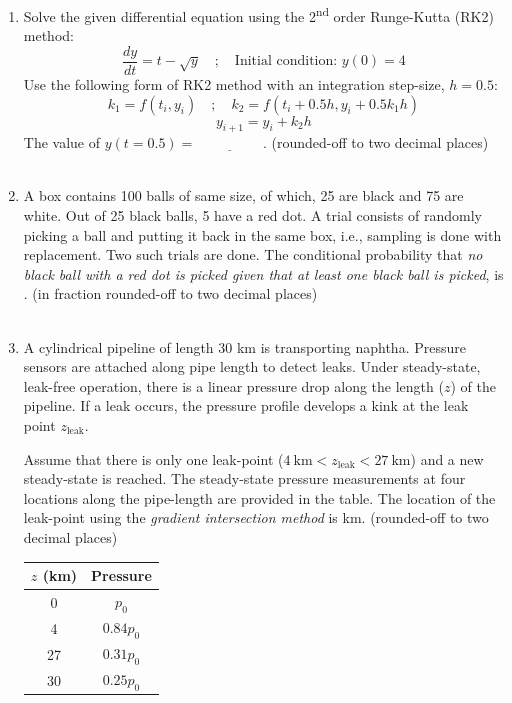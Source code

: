 \documentclass[12pt,a4paper]{article}
\begin{document}
\begin{enumerate}
\pagebreak

\item Solve the given differential equation using the 2\textsuperscript{nd} order Runge-Kutta (RK2) method: \hfill{}\[ \frac{dy}{dt} = t - \sqrt{y} \quad ; \quad \text{Initial condition: } y(0) = 4 \]
Use the following form of RK2 method with an integration step-size, $h = 0.5$:
\[ k_1 = f(t_i, y_i) \quad ; \quad k_2 = f(t_i + 0.5h, y_i + 0.5k_1 h) \]
\[ y_{i+1} = y_i + k_2 h \]
The value of $y(t = 0.5) = \underline{\hspace{2cm}}$. (rounded-off to two decimal places)\\\\

\item A box contains 100 balls of same size, of which, 25 are black and 75 are white. Out of 25 black balls, 5 have a red dot. A trial consists of randomly picking a ball and putting it back in the same box, i.e., sampling is done with replacement. Two such trials are done. The conditional probability that \textit{no black ball with a red dot is picked given that at least one black ball is picked}, is \underline{\hspace{2cm}}. (in fraction rounded-off to two decimal places) \hfill{}\\\\



\item A cylindrical pipeline of length 30 km is transporting naphtha. Pressure sensors are attached along pipe length to detect leaks. Under steady-state, leak-free operation, there is a linear pressure drop along the length ($z$) of the pipeline. If a leak occurs, the pressure profile develops a kink at the leak point $z_{\text{leak}}$.

\vspace{0.2cm}
Assume that there is only one leak-point ($4~\text{km} < z_{\text{leak}} < 27~\text{km}$) and a new steady-state is reached. The steady-state pressure measurements at four locations along the pipe-length are provided in the table. The location of the leak-point using the \textit{gradient intersection method} is \underline{\hspace{2cm}} km. (rounded-off to two decimal places) \hfill{}

\vspace{0.3cm}
\begin{tabular}{|c|c|}
\hline
$z$ (km) & Pressure \\
\hline
0 & $p_0$ \\
4 & $0.84p_0$ \\
27 & $0.31p_0$ \\
30 & $0.25p_0$ \\
\hline
\end{tabular}
\pagebreak


\end{enumerate}
\end{document}
